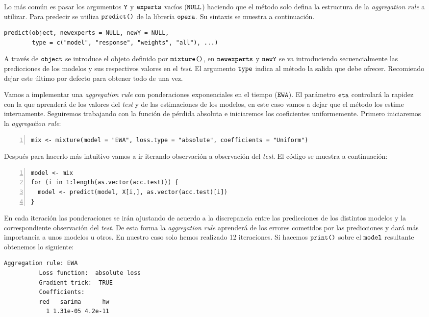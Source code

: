 Lo más común es pasar los argumentos $\verb!Y!$ y $\verb!experts!$ vacíos ($\verb!NULL!$) haciendo que el método solo defina la estructura de la \textit{aggregation rule} a utilizar. Para predecir se utiliza $\verb!predict()!$ de la librería $\verb!opera!$. Su sintaxis se muestra a continuación.
\begin{Verbatim}[fontsize=\footnotesize]
predict(object, newexperts = NULL, newY = NULL,
        type = c("model", "response", "weights", "all"), ...)
\end{Verbatim}

A través de $\verb!object!$ se introduce el objeto definido por $\verb!mixture()!$, en $\verb!newexperts!$ y $\verb!newY!$ se va introduciendo secuencialmente las predicciones de los modelos y sus respectivos valores en el \textit{test}. El argumento $\verb!type!$ indica al método la salida que debe ofrecer. Recomiendo dejar este último por defecto para obtener todo de una vez.

Vamos a implementar una \textit{aggregation rule} con ponderaciones exponenciales en el tiempo ($\verb!EWA!$). El parámetro $\verb!eta!$ controlará  la rapidez con la que aprenderá de los valores del \textit{test} y de las estimaciones de los modelos, en este caso vamos a dejar que el método los estime internamente. Seguiremos trabajando con la función de pérdida absoluta e iniciaremos los coeficientes uniformemente. Primero iniciaremos la \textit{aggregation rule}:
\begin{Verbatim}[fontsize=\footnotesize, numbers = left]
mix <- mixture(model = "EWA", loss.type = "absolute", coefficients = "Uniform")
\end{Verbatim}

Después para hacerlo más intuitivo vamos a ir iterando observación a observación del \textit{test}. El código se muestra a continuación:
\begin{Verbatim}[fontsize=\footnotesize, numbers = left]
model <- mix
for (i in 1:length(as.vector(acc.test))) {
  model <- predict(model, X[i,], as.vector(acc.test)[i])
}
\end{Verbatim}

En cada iteración las ponderaciones se irán ajustando de acuerdo a la discrepancia entre las predicciones de los distintos modelos y la correspondiente observación del \textit{test}. De esta forma la \textit{aggregation rule} aprenderá de los errores cometidos por las predicciones y dará más importancia a unos modelos u otros. En nuestro caso solo hemos realizado 12 iteraciones. Si hacemos $\verb!print()!$ sobre el $\verb!model!$ resultante obtenemos lo siguiente:
\begin{Verbatim}[fontsize=\footnotesize]
          Aggregation rule: EWA
          Loss function:  absolute loss
          Gradient trick:  TRUE
          Coefficients:
          red   sarima      hw
            1 1.31e-05 4.2e-11
\end{Verbatim}

